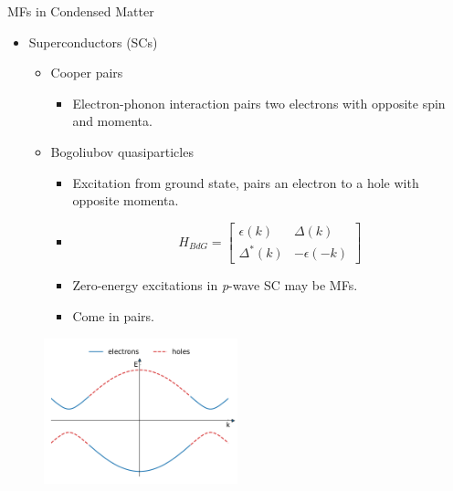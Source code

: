 \documentclass[xcolor=dvipsnames,10pt,aspectratio=169]{beamer}
\newcommand{\de}{\Delta}
\begin{document}
  \begin{frame}{MFs in Condensed Matter}
    \begin{multicols}{2}
      \begin{itemize}
        \item Superconductors (SCs)
          \begin{itemize}
            \item Cooper pairs
            \begin{itemize}
              \item Electron-phonon interaction pairs two electrons with opposite spin and momenta.
            \end{itemize}
            \pause
            \item Bogoliubov quasiparticles
            \begin{itemize}
              \item Excitation from ground state, pairs an electron to a hole with opposite momenta.
              \item[] \[ H_{BdG} = \begin{bmatrix} \epsilon(k) & \de(k) \\ \de^\ast(k) & -\epsilon(-k) \end{bmatrix} \]
              \item Zero-energy excitations in \textit{p}-wave SC may be MFs.
              \item Come in pairs.
            \end{itemize}
          \end{itemize}
      \end{itemize}
      \vspace{30mm}

      \begin{figure}
        \includegraphics[width=0.50\textwidth]{./figures/p-wave-mu-p1_25.pdf}
      \end{figure}

    \end{multicols}

  \end{frame}
\end{document}
